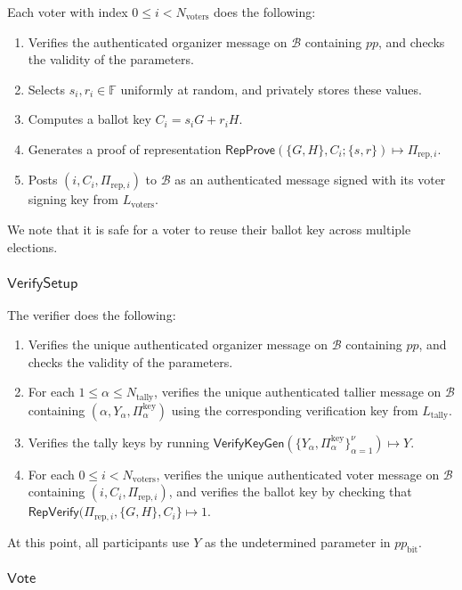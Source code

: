 \documentclass{llncs}
\newcommand{\F}{\mathbb{F}}
\newcommand{\func}[1]{\mathsf{#1}}
\begin{document}
Each voter with index $0 \leq i < N_{\text{voters}}$ does the following:
\begin{enumerate}
    \item Verifies the authenticated organizer message on $\mathcal{B}$ containing $pp$, and checks the validity of the parameters.
    \item Selects $s_i, r_i \in \F$ uniformly at random, and privately stores these values.
    \item Computes a ballot key $C_i = s_i G + r_i H$.
    \item Generates a proof of representation $\func{RepProve}(\{G, H\}, C_i ; \{s, r\}) \mapsto \Pi_{\text{rep},i}$.
    \item Posts $(i, C_i, \Pi_{\text{rep},i})$ to $\mathcal{B}$ as an authenticated message signed with its voter signing key from $L_{\text{voters}}$.
\end{enumerate}
We note that it is safe for a voter to reuse their ballot key across multiple elections.


\subsubsection{\texorpdfstring{$\func{VerifySetup}$}{VerifySetup}}

The verifier does the following:
\begin{enumerate}
    \item Verifies the unique authenticated organizer message on $\mathcal{B}$ containing $pp$, and checks the validity of the parameters.
    \item For each $1 \leq \alpha \leq N_{\text{tally}}$, verifies the unique authenticated tallier message on $\mathcal{B}$ containing $(\alpha, Y_\alpha, \Pi_\alpha^{\text{key}})$ using the corresponding verification key from $L_{\text{tally}}$.
    \item Verifies the tally keys by running $\func{VerifyKeyGen}(\{Y_\alpha, \Pi_\alpha^{\text{key}}\}_{\alpha=1}^{\nu}) \mapsto Y$.
    \item For each $0 \leq i < N_{\text{voters}}$, verifies the unique authenticated voter message on $\mathcal{B}$ containing $(i, C_i, \Pi_{\text{rep},i})$, and verifies the ballot key by checking that $\func{RepVerify}(\Pi_{\text{rep},i}, \{G, H\}, C_i\} \mapsto 1$.
\end{enumerate}
At this point, all participants use $Y$ as the undetermined parameter in $pp_{\text{bit}}$.


\subsubsection{\texorpdfstring{$\func{Vote}$}{Vote}}
\end{document}

